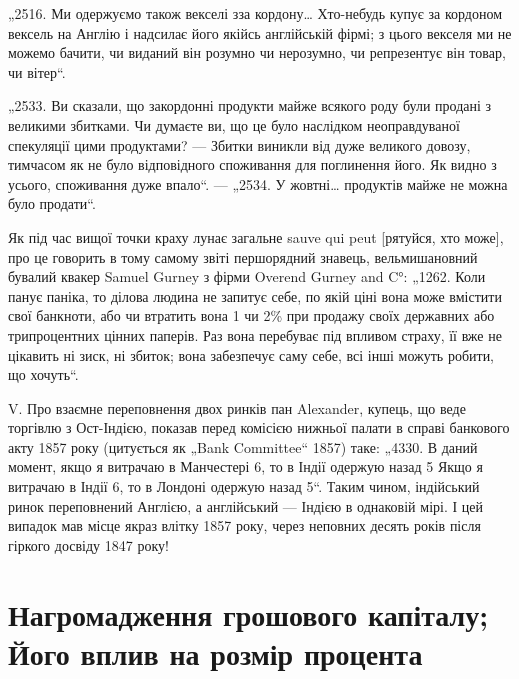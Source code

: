 „2516. Ми одержуємо також векселі зза кордону\dots{} Хто-небудь купує за кордоном вексель на Англію і
надсилає його якійсь англійській фірмі; з цього векселя ми не можемо бачити, чи виданий він розумно
чи нерозумно, чи репрезентує він товар, чи вітер“.

„2533. Ви сказали, що закордонні продукти майже всякого роду були продані з великими збитками. Чи
думаєте ви, що це було наслідком неоправдуваної
спекуляції цими продуктами? — Збитки виникли від дуже великого довозу, тимчасом як не було
відповідного споживання для поглинення його. Як видно з
усього, споживання дуже впало“. — „2534. У жовтні\dots{} продуктів майже не можна
було продати“.

Як під час вищої точки краху лунає загальне sauve qui peut [рятуйся, хто
може], про це говорить в тому самому звіті першорядний знавець, вельмишановний бувалий квакер Samuel
Gurney з фірми Overend Gurney and C°: „1262. Коли
панує паніка, то ділова людина не запитує себе, по якій ціні вона може вмістити свої банкноти, або
чи втратить вона 1 чи 2\% при продажу своїх державних або трипроцентних цінних паперів. Раз вона
перебуває під впливом страху, її вже не цікавить ні зиск, ні збиток; вона забезпечує саму себе, всі
інші
можуть робити, що хочуть“.

V. Про взаємне переповнення двох ринків пан Alexander, купець, що веде
торгівлю з Ост-Індією, показав перед комісією нижньої палати в справі банкового акту 1857 року
(цитується як „Bank Committee“ 1857) таке: „4330. В даний
момент, якщо я витрачаю в Манчестері 6, то в Індії одержую назад
5 Якщо я витрачаю в Індії 6, то в Лондоні одержую назад
5“. Таким чином, індійський ринок переповнений Англією, а англійський — Індією в однаковій
мірі. І цей випадок мав місце якраз влітку 1857 року,
через неповних десять років після гіркого досвіду 1847 року!

\section{Нагромадження грошового капіталу; Його вплив на розмір процента}

